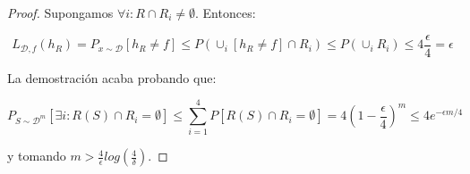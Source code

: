 \begin{example}
\begin{proof}
    Supongamos $\forall i : R \cap R_i \neq \emptyset$. Entonces:

    \[L_{\mathcal{D},f}(h_R) = P_{x\sim \mathcal{D}} [h_R \neq f] \le P \left(\cup_i [h_R \neq f] \cap R_i\right) \le P \left(\cup_i R_i\right) \le 4\frac{\epsilon}{4} = \epsilon\]

    La demostración acaba probando que:

    \[P_{S\sim \mathcal{D}^m} [\exists i : R(S)\cap R_i = \emptyset] \le \sum_{i=1}^4 P [R(S)\cap R_i = \emptyset] = 4(1-\frac{\epsilon}{4})^m \le 4e^{-\epsilon m/4}\]

    y tomando $m > \frac{4}{\epsilon} log \left( \frac{4}{\delta} \right)$.
    \end{proof}
\end{example}

